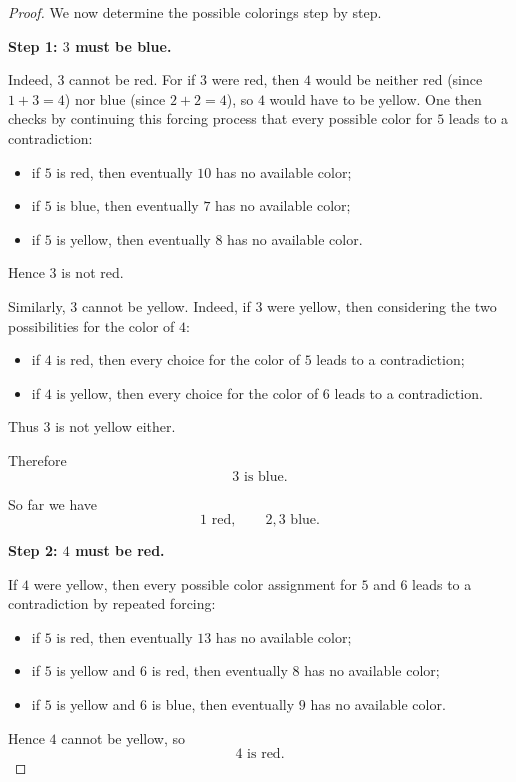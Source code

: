 \documentclass[11pt, a4paper]{ctexrep}
\begin{document}
\begin{proof}
    We now determine the possible colorings step by step.

    \medskip

    \noindent\textbf{Step 1: $3$ must be blue.}

    Indeed, $3$ cannot be red. For if $3$ were red, then $4$ would be neither red (since $1+3=4$) nor blue (since $2+2=4$), so $4$ would have to be yellow. One then checks by continuing this forcing process that every possible color for $5$ leads to a contradiction:
    \begin{itemize}
        \item if $5$ is red, then eventually $10$ has no available color;
        \item if $5$ is blue, then eventually $7$ has no available color;
        \item if $5$ is yellow, then eventually $8$ has no available color.
    \end{itemize}
    Hence $3$ is not red.

    Similarly, $3$ cannot be yellow. Indeed, if $3$ were yellow, then considering the two possibilities for the color of $4$:
    \begin{itemize}
        \item if $4$ is red, then every choice for the color of $5$ leads to a contradiction;
        \item if $4$ is yellow, then every choice for the color of $6$ leads to a contradiction.
    \end{itemize}
    Thus $3$ is not yellow either.

    Therefore
    \[
        3\text{ is blue}.
    \]

    So far we have
    \[
        1\text{ red},\qquad 2,3\text{ blue}.
    \]

    \medskip

    \noindent\textbf{Step 2: $4$ must be red.}

    If $4$ were yellow, then every possible color assignment for $5$ and $6$ leads to a contradiction by repeated forcing:
    \begin{itemize}
        \item if $5$ is red, then eventually $13$ has no available color;
        \item if $5$ is yellow and $6$ is red, then eventually $8$ has no available color;
        \item if $5$ is yellow and $6$ is blue, then eventually $9$ has no available color.
    \end{itemize}
    Hence $4$ cannot be yellow, so
    \[
        4\text{ is red}.
    \]


\end{proof}
\end{document}
